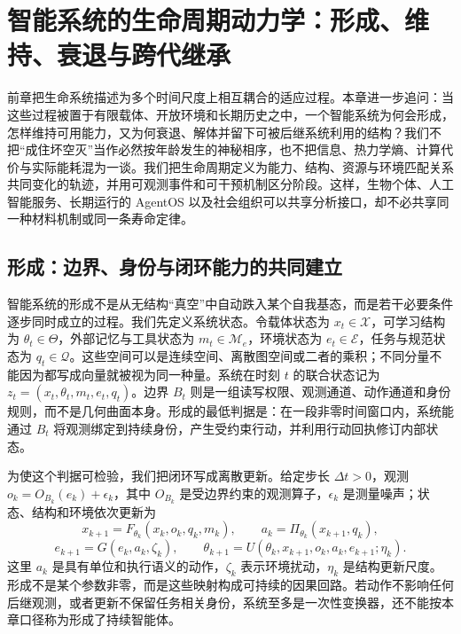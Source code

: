 \chapter{智能系统的生命周期动力学：形成、维持、衰退与跨代继承}
\label{chp:intelligence_lifecycle}

前章把生命系统描述为多个时间尺度上相互耦合的适应过程。本章进一步追问：当这些过程被置于有限载体、开放环境和长期历史之中，一个智能系统为何会形成，怎样维持可用能力，又为何衰退、解体并留下可被后继系统利用的结构？我们不把“成住坏空灭”当作必然按年龄发生的神秘相序，也不把信息、热力学熵、计算代价与实际能耗混为一谈。我们把生命周期定义为能力、结构、资源与环境匹配关系共同变化的轨迹，并用可观测事件和可干预机制区分阶段。这样，生物个体、人工智能服务、长期运行的 AgentOS 以及社会组织可以共享分析接口，却不必共享同一种材料机制或同一条寿命定律。

\section{形成：边界、身份与闭环能力的共同建立}
\label{sec:formation}

智能系统的形成不是从无结构“真空”中自动跌入某个自我基态，而是若干必要条件逐步同时成立的过程。我们先定义系统状态。令载体状态为 $x_t\in\mathcal X$，可学习结构为 $\theta_t\in\Theta$，外部记忆与工具状态为 $m_t\in\mathcal M_e$，环境状态为 $e_t\in\mathcal E$，任务与规范状态为 $q_t\in\mathcal Q$。这些空间可以是连续空间、离散图空间或二者的乘积；不同分量不能因为都写成向量就被视为同一种量。系统在时刻 $t$ 的联合状态记为 $z_t=(x_t,\theta_t,m_t,e_t,q_t)$。边界 $B_t$ 则是一组读写权限、观测通道、动作通道和身份规则，而不是几何曲面本身。形成的最低判据是：在一段非零时间窗口内，系统能通过 $B_t$ 将观测绑定到持续身份，产生受约束行动，并利用行动回执修订内部状态。

为使这个判据可检验，我们把闭环写成离散更新。给定步长 $\Delta t>0$，观测 $o_k=O_{B_k}(e_k)+\epsilon_k$，其中 $O_{B_k}$ 是受边界约束的观测算子，$\epsilon_k$ 是测量噪声；状态、结构和环境依次更新为
\begin{equation}
    x_{k+1}=F_{\theta_k}(x_k,o_k,q_k,m_k),\qquad
    a_k=\Pi_{\theta_k}(x_{k+1},q_k),
\end{equation}
\begin{equation}
    e_{k+1}=G(e_k,a_k,\zeta_k),\qquad
    \theta_{k+1}=U(\theta_k,x_{k+1},o_k,a_k,e_{k+1};\eta_k).
\end{equation}
这里 $a_k$ 是具有单位和执行语义的动作，$\zeta_k$ 表示环境扰动，$\eta_k$ 是结构更新尺度。形成不是某个参数非零，而是这些映射构成可持续的因果回路。若动作不影响任何后继观测，或者更新不保留任务相关身份，系统至多是一次性变换器，还不能按本章口径称为形成了持续智能体。

